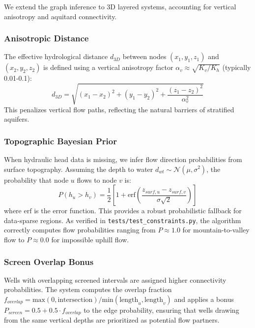 \documentclass[12pt,a4paper]{article}
\theoremstyle{plain}
\theoremstyle{definition}
\theoremstyle{remark}
\begin{document}
We extend the graph inference to 3D layered systems, accounting for vertical anisotropy and aquitard connectivity.

\subsubsection{Anisotropic Distance}

The effective hydrological distance $d_{3D}$ between nodes $(x_1, y_1, z_1)$ and $(x_2, y_2, z_2)$ is defined using a vertical anisotropy factor $\alpha_v \approx \sqrt{K_v/K_h}$ (typically 0.01-0.1):
\begin{equation}
	d_{3D} = \sqrt{(x_1-x_2)^2 + (y_1-y_2)^2 + \frac{(z_1-z_2)^2}{\alpha_v^2}}
\end{equation}
This penalizes vertical flow paths, reflecting the natural barriers of stratified aquifers.

\subsubsection{Topographic Bayesian Prior}

When hydraulic head data is missing, we infer flow direction probabilities from surface topography. Assuming the depth to water $d_{wt} \sim \mathcal{N}(\mu, \sigma^2)$, the probability that node $u$ flows to node $v$ is:
\begin{equation}
	P(h_u > h_v) = \frac{1}{2} \left[ 1 + \text{erf}\left( \frac{z_{surf,u} - z_{surf,v}}{\sigma \sqrt{2}} \right) \right]
\end{equation}
where $\text{erf}$ is the error function. This provides a robust probabilistic fallback for data-sparse regions. As verified in \texttt{tests/test\_constraints.py}, the algorithm correctly computes flow probabilities ranging from $P \approx 1.0$ for mountain-to-valley flow to $P \approx 0.0$ for impossible uphill flow.

\subsubsection{Screen Overlap Bonus}

Wells with overlapping screened intervals are assigned higher connectivity probabilities. The system computes the overlap fraction $f_{overlap} = \text{max}(0, \text{intersection}) / \text{min}(\text{length}_u, \text{length}_v)$ and applies a bonus $P_{screen} = 0.5 + 0.5 \cdot f_{overlap}$ to the edge probability, ensuring that wells drawing from the same vertical depths are prioritized as potential flow partners.
\end{document}
